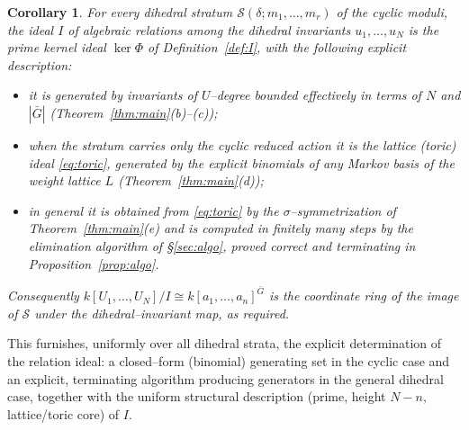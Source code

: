 \documentclass{amsart}
\newtheorem{corollary}[theorem]{Corollary}
\theoremstyle{definition}
\begin{document}
\begin{corollary}\label{cor:answer}
For every dihedral stratum $\mathcal S(\delta;m_1,\dots,m_r)$ of the cyclic
moduli, the ideal $I$ of algebraic relations among the dihedral invariants
$u_1,\dots,u_N$ is the prime kernel ideal $\ker\Phi$ of Definition~\ref{def:I},
with the following explicit description:
\begin{itemize}
\item it is generated by invariants of $U$--degree bounded effectively in terms of
$N$ and $|\bar G|$ (Theorem~\ref{thm:main}(b)--(c));
\item when the stratum carries only the cyclic reduced action it is the lattice
(toric) ideal \eqref{eq:toric}, generated by the explicit binomials of any Markov
basis of the weight lattice $L$ (Theorem~\ref{thm:main}(d));
\item in general it is obtained from \eqref{eq:toric} by the
$\sigma$--symmetrization of Theorem~\ref{thm:main}(e) and is computed in finitely
many steps by the elimination algorithm of \S\ref{sec:algo}, proved correct and
terminating in Proposition~\ref{prop:algo}.
\end{itemize}
Consequently $k[U_1,\dots,U_N]/I\cong k[a_1,\dots,a_n]^{\bar G}$ is the coordinate
ring of the image of $\mathcal S$ under the dihedral--invariant map, as required.
\end{corollary}

This furnishes, uniformly over all dihedral strata, the explicit determination of
the relation ideal: a closed--form (binomial) generating set in the cyclic case
and an explicit, terminating algorithm producing generators in the general
dihedral case, together with the uniform structural description (prime,
height $N-n$, lattice/toric core) of $I$.
\end{document}
